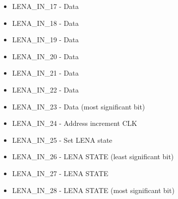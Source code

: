 \begin{itemize}
\item LENA\_IN\_17 - Data
\item LENA\_IN\_18 - Data
\item LENA\_IN\_19 - Data
\item LENA\_IN\_20 - Data
\item LENA\_IN\_21 - Data
\item LENA\_IN\_22 - Data
\item LENA\_IN\_23 - Data (most significant bit)
\item LENA\_IN\_24 - Address increment CLK
\item LENA\_IN\_25 - Set LENA state
\item LENA\_IN\_26 - LENA STATE (least significant bit)
\item LENA\_IN\_27 - LENA STATE
\item LENA\_IN\_28 - LENA STATE (most significant bit)
\end{itemize}
